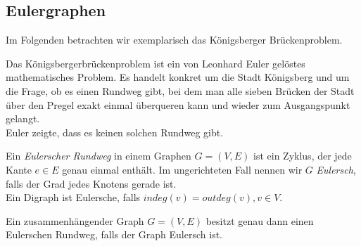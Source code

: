 \subsection{Eulergraphen}
Im Folgenden betrachten wir exemplarisch das Königsberger Brückenproblem.
\begin{fluff}
Das Königsbergerbrückenproblem ist ein von Leonhard Euler gelöstes mathematisches Problem. Es handelt konkret um die Stadt Königsberg und um die Frage, ob es einen Rundweg gibt, bei dem man alle sieben Brücken der Stadt über den Pregel exakt einmal überqueren kann und wieder zum Ausgangspunkt gelangt.
\\ Euler zeigte, dass es keinen solchen Rundweg gibt.
\end{fluff}
\begin{definition}
Ein \emph{Eulerscher Rundweg} in einem Graphen $G=(V,E)$ ist ein Zyklus, der jede Kante $e \in  E$ genau einmal enthält. Im ungerichteten Fall nennen wir $G$ \emph{Eulersch}, falls der Grad jedes Knotens gerade ist. \\
Ein Digraph ist Eulersche, falls $indeg(v)= outdeg(v), v \in  V$.
\end{definition}
\begin{theorem}
	\label{thm:eulergraph}
	Ein zusammenhängender Graph $G=(V,E)$ besitzt genau dann einen Eulerschen Rundweg, falls der Graph Eulersch ist.
\end{theorem}

